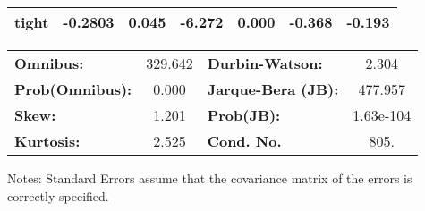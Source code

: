 \begin{center}
\begin{tabular}{lcccccc}
\textbf{tight}                    &      -0.2803  &        0.045     &    -6.272  &         0.000        &       -0.368    &       -0.193     \\
\bottomrule
\end{tabular}
\begin{tabular}{lclc}
\textbf{Omnibus:}       & 329.642 & \textbf{  Durbin-Watson:     } &     2.304  \\
\textbf{Prob(Omnibus):} &   0.000 & \textbf{  Jarque-Bera (JB):  } &   477.957  \\
\textbf{Skew:}          &   1.201 & \textbf{  Prob(JB):          } & 1.63e-104  \\
\textbf{Kurtosis:}      &   2.525 & \textbf{  Cond. No.          } &      805.  \\
\bottomrule
\end{tabular}
\end{center}

Notes: \newline
 [1] Standard Errors assume that the covariance matrix of the errors is correctly specified.